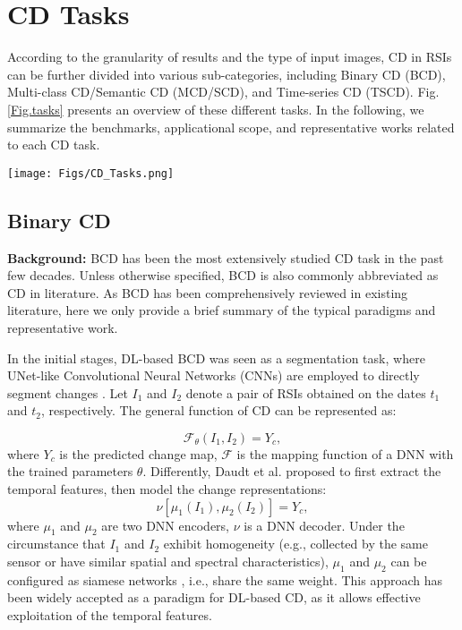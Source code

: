 \section{CD Tasks}\label{sec_outline}

According to the granularity of results and the type of input images, CD in RSIs can be further divided into various sub-categories, including Binary CD (BCD), Multi-class CD/Semantic CD (MCD/SCD), and Time-series CD (TSCD). Fig.\ref{Fig.tasks} presents an overview of these different tasks. In the following, we summarize the benchmarks, applicational scope, and representative works related to each CD task.

\begin{figure*}[t]
\centering
    \texttt{[image: Figs/CD\_Tasks.png]}
    \caption{A comparison between (a) BCD, (b) MCD/SCD, and (c) TSCD. The color regions in $Y_1, Y_2, Y_3$ and $Y_c^{1 \rightarrow t}$ indicate the pre-defined LCLU/change categories.}
    \label{Fig.tasks}
\end{figure*}

\subsection{Binary CD}

\textbf{Background:} BCD has been the most extensively studied CD task in the past few decades. Unless otherwise specified, BCD is also commonly abbreviated as CD in literature. As BCD has been comprehensively reviewed in existing literature, here we only provide a brief summary of the typical paradigms and representative work.

In the initial stages, DL-based BCD was seen as a segmentation task, where UNet-like Convolutional Neural Networks (CNNs) are employed to directly segment changes \cite{peng2019end}. Let $I_1$ and $I_2$ denote a pair of RSIs obtained on the dates $t_1$ and $t_2$, respectively. The general function of CD can be represented as:

\begin{equation}
    \mathcal{F}_{\theta}(I_1, I_2) = Y_c,
\end{equation}
where $Y_c$ is the predicted change map, $\mathcal{F}$ is the mapping function of a DNN with the trained parameters $\theta$. Differently, Daudt et al. \cite{daudt2018fully} proposed to first extract the temporal features, then model the change representations:
\begin{equation} \label{eq.BCD}
    \nu [\mu_1(I_1), \mu_2(I_2)] = Y_c,
\end{equation}
where $\mu_1$ and $\mu_2$ are two DNN encoders, $\nu$ is a DNN decoder. 
Under the circumstance that $I_1$ and $I_2$ exhibit homogeneity (e.g., collected by the same sensor or have similar spatial and spectral characteristics), $\mu_1$ and $\mu_2$ can be configured as siamese networks \cite{daudt2018fully}, i.e., share the same weight. This approach has been widely accepted as a paradigm for DL-based CD, as it allows effective exploitation of the temporal features.

